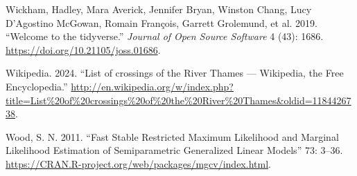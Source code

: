 \begin{CSLReferences}{1}{0}
\leavevmode{}%
Wickham, Hadley, Mara Averick, Jennifer Bryan, Winston Chang, Lucy D'Agostino McGowan, Romain François, Garrett Grolemund, et al. 2019. {``Welcome to the {tidyverse}.''} \emph{Journal of Open Source Software} 4 (43): 1686. \url{https://doi.org/10.21105/joss.01686}.

\leavevmode{}%
Wikipedia. 2024. {``{List of crossings of the River Thames} --- {W}ikipedia{,} the Free Encyclopedia.''} \url{http://en.wikipedia.org/w/index.php?title=List\%20of\%20crossings\%20of\%20the\%20River\%20Thames\&oldid=1184426738}.

\leavevmode{}%
Wood, S. N. 2011. {``Fast Stable Restricted Maximum Likelihood and Marginal Likelihood Estimation of Semiparametric Generalized Linear Models''} 73: 3--36. \url{https://CRAN.R-project.org/web/packages/mgcv/index.html}.

\end{CSLReferences}



\address{%
Kevin Horan\\
Hamilton Institute, Maynooth University\\%
Maynooth\\ Co.~Kildare, Ireland\\
%
\url{https://github.com/horankev}\\%
\textit{ORCiD: \href{https://orcid.org/0009-0003-9378-0084}{0009-0003-9378-0084}}\\%
\href{mailto:kevin.horan.2021@mumail.ie}{\nolinkurl{kevin.horan.2021@mumail.ie}}%
}

\address{%
Katarina Domijan\\
Department of Mathematics and Statistics, Maynooth University\\%
Maynooth\\ Co.~Kildare, Ireland\\
%
%
\textit{ORCiD: \href{https://orcid.org/0000-0002-4268-2236}{0000-0002-4268-2236}}\\%
\href{mailto:katarina.domijan@mu.ie}{\nolinkurl{katarina.domijan@mu.ie}}%
}

\address{%
Chris Brunsdon\\
National Centre for Geocomputation, Maynooth University\\%
Maynooth\\ Co.~Kildare, Ireland\\
%
%
\textit{ORCiD: \href{https://orcid.org/0000-0003-4254-1780}{0000-0003-4254-1780}}\\%
\href{mailto:Christopher.Brunsdon@mu.ie}{\nolinkurl{Christopher.Brunsdon@mu.ie}}%
}
